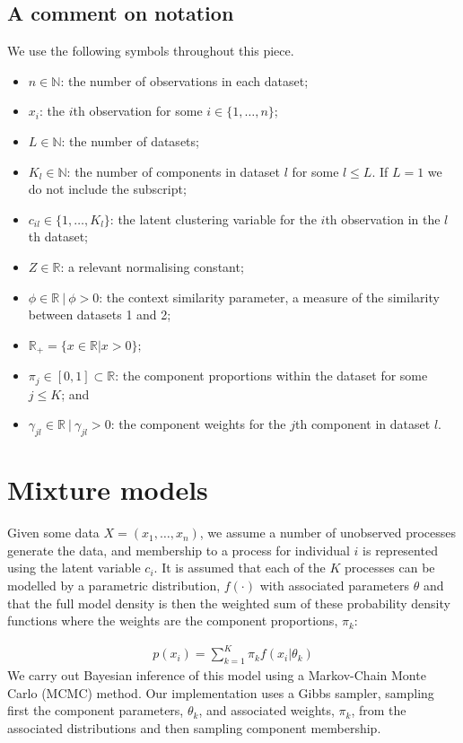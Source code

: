 \documentclass[11pt]{article} %
\begin{document}
\subsection*{A comment on notation}
We use the following symbols throughout this piece.
\begin{itemize}
 \item $n \in \mathbb{N}$: the number of observations in each dataset;
 \item $x_i$: the $i$th observation for some $i \in \{1,\ldots, n\}$;
 \item $L  \in \mathbb{N}$: the number of datasets;
 \item $K_l \in \mathbb{N}$: the number of components in dataset $l$ for some $l \leq L$. If $L = 1$ we do not include the subscript;
 \item $c_{il} \in \{1,\ldots,K_l\}$: the latent clustering variable for the $i$th observation in the $l$th dataset;
 \item $Z \in \mathbb{R}$: a relevant normalising constant;
 \item $\phi \in \mathbb{R} \: | \: \phi > 0$: the context similarity parameter, a measure of the similarity between datasets 1 and 2;
 \item $\mathbb{R}_+ = \{x \in \mathbb{R} | x > 0\};$
 \item $\pi_j \in [0, 1] \subset \mathbb{R}$: the component proportions within the dataset for some $j \leq K$; and
 \item $\gamma_{jl} \in \mathbb{R}  \: | \: \gamma_{jl} > 0$: the component weights for the $j$th component in dataset $l$.
\end{itemize}

\section{Mixture models} \label{mixture_models}
Given some data $X = (x_1, \ldots, x_n)$, we assume a number of unobserved processes generate the data, and membership to a process for individual $i$ is represented using the latent variable $c_i$. It is assumed that each of the $K$ processes can be modelled by a parametric distribution, $f(\cdot)$ with associated parameters $\theta$ and that the full model density is then the weighted sum of these probability density functions where the weights are the component proportions, $\pi_k$:

\begin{align}
p(x_i) = \sum_{k=1}^K \pi_k f(x_i | \theta_k)
\end{align}
We carry out Bayesian inference of this model using a Markov-Chain Monte Carlo (MCMC) method. Our implementation uses a Gibbs sampler, sampling first the component parameters, $\theta_k$, and associated weights, $\pi_k$, from the associated distributions and then sampling component membership.
\end{document}
